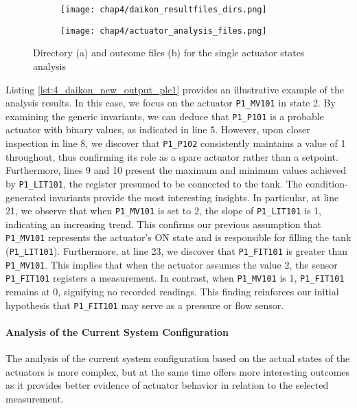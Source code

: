 \begin{figure}[H]
	\centering
	\begin{subfigure}{0.48\textwidth}
		\texttt{[image: chap4/daikon\_resultfiles\_dirs.png]}
		\caption{}
		\label{subfig:4_daikon_results_dir}
	\end{subfigure}
	\hfill
	\begin{subfigure}{0.48\textwidth}
		\texttt{[image: chap4/actuator\_analysis\_files.png]}
		\caption{}
		\label{subfig:4_daikon_results_file}
	\end{subfigure}
	\caption{Directory (a) and outcome files (b) for the single actuator states analysis}
	\label{fig:4_daikon_simpleanalysis_dirfiles}
\end{figure}

Listing \ref{lst:4_daikon_new_output_plc1} provides an illustrative example of the analysis results. In this case, we focus on the actuator \texttt{P1\_MV101} in state 2. By examining the generic invariants, we can deduce that \texttt{P1\_P101} is a probable actuator with binary values, as indicated in line 5. However, upon closer inspection in line 8, we discover that \texttt{P1\_P102} consistently maintains a value of 1 throughout, thus confirming its role as a spare actuator rather than a setpoint. Furthermore, lines 9 and 10 present the maximum and minimum values achieved by \texttt{P1\_LIT101}, the register presumed to be connected to the tank.\newline
The condition-generated invariants provide the most interesting insights. In particular, at line 21, we observe that when \texttt{P1\_MV101} is set to 2, the slope of \texttt{P1\_LIT101} is 1, indicating an increasing trend. This confirms our previous assumption that \texttt{P1\_MV101} represents the actuator's ON state and is responsible for filling the tank (\texttt{P1\_LIT101}).\newline
Furthermore, at line 23, we discover that \texttt{P1\_FIT101} is greater than \texttt{P1\_MV101}. This implies that when the actuator assumes the value 2, the sensor \texttt{P1\_FIT101} registers a measurement. In contrast, when \texttt{P1\_MV101} is 1, \texttt{P1\_FIT101} remains at 0, signifying no recorded readings. This finding reinforces our initial hypothesis that \texttt{P1\_FIT101} may serve as a pressure or flow sensor.

\paragraph{Analysis of the Current System Configuration}
\label{par:4_current_system_config_analysis}
The analysis of the current system configuration based on the actual states of the actuators is more complex, but at the same time offers more interesting outcomes as it provides better evidence of actuator behavior in relation to the selected measurement.

